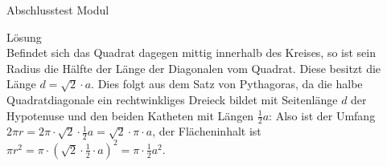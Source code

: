 \begin{MTest}{Abschlusstest Modul }
\begin{MExercise}
\begin{MHint}{L\"osung}
\ \\
Befindet sich das Quadrat dagegen mittig innerhalb des Kreises, so ist sein Radius die H\"alfte der L\"ange der Diagonalen vom Quadrat. Diese besitzt
die L\"ange $d=\sqrt2\cdot a$. Dies folgt aus dem Satz von Pythagoras, da die halbe Quadratdiagonale ein rechtwinkliges Dreieck bildet
mit Seitenl\"ange $d$ der Hypotenuse und den beiden Katheten mit L\"angen $\frac12a$: Also ist der Umfang $2\pi r=2\pi\cdot \sqrt2 \cdot\frac12 a=\sqrt2\cdot \pi \cdot a$,
der Fl\"acheninhalt ist $\pi r^2=\pi \cdot (\sqrt2\cdot \frac12\cdot a)^2=\pi \cdot\frac12 a^2$.
\end{MHint}
\end{MExercise}

\end{MTest}



